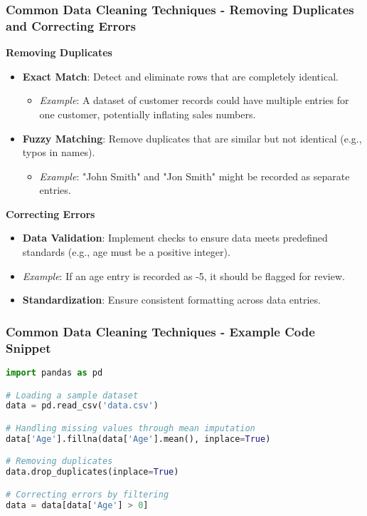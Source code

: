 \documentclass[aspectratio=169]{beamer}
\begin{document}
\begin{frame}[fragile]
    \frametitle{Common Data Cleaning Techniques - Removing Duplicates and Correcting Errors}
    \textbf{Removing Duplicates}
    \begin{itemize}
        \item \textbf{Exact Match}: Detect and eliminate rows that are completely identical.
            \begin{itemize}
                \item \textit{Example}: A dataset of customer records could have multiple entries for one customer, potentially inflating sales numbers.
            \end{itemize}  
        \item \textbf{Fuzzy Matching}: Remove duplicates that are similar but not identical (e.g., typos in names).
            \begin{itemize}
                \item \textit{Example}: "John Smith" and "Jon Smith" might be recorded as separate entries.
            \end{itemize}
    \end{itemize}

    \textbf{Correcting Errors}
    \begin{itemize}
        \item \textbf{Data Validation}: Implement checks to ensure data meets predefined standards (e.g., age must be a positive integer).
        \item \textit{Example}: If an age entry is recorded as -5, it should be flagged for review.
        \item \textbf{Standardization}: Ensure consistent formatting across data entries.
    \end{itemize}
\end{frame}

\begin{frame}[fragile]
    \frametitle{Common Data Cleaning Techniques - Example Code Snippet}
    \begin{lstlisting}[language=Python]
import pandas as pd

# Loading a sample dataset
data = pd.read_csv('data.csv')

# Handling missing values through mean imputation
data['Age'].fillna(data['Age'].mean(), inplace=True)

# Removing duplicates
data.drop_duplicates(inplace=True)

# Correcting errors by filtering
data = data[data['Age'] > 0]
    \end{lstlisting}
\end{frame}
\end{document}
